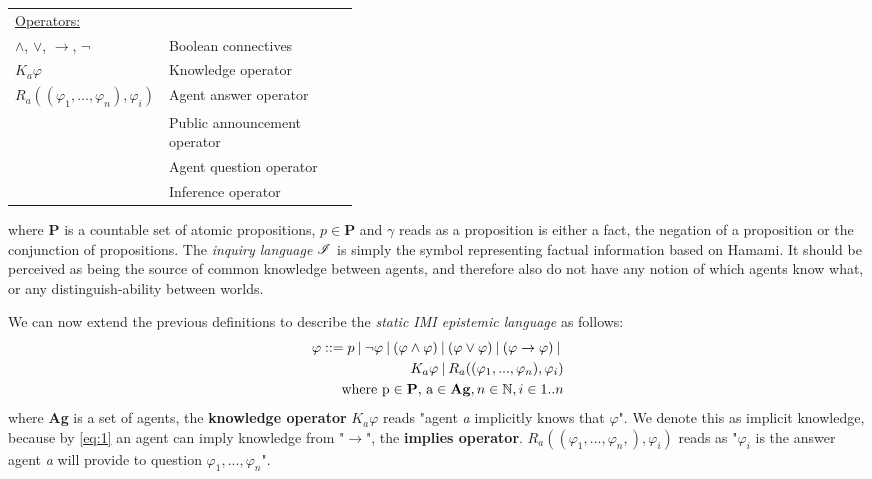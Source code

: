 \begin{table}[t]
\begin{tabularx}{\linewidth}{p{0.40\linewidth}X}
		\multicolumn{2}{l}{{\underline{Operators:}}}                                                           \\
		$\land$, $\lor$, $\rightarrow$, $\neg$    & Boolean connectives                                      \\
		$K_a\varphi$                                & Knowledge operator                                       \\
		$R_a((\varphi_1,...,\varphi_n), \varphi_i)$ & Agent answer operator                                    \\
		\pubop                                      & Public announcement operator                             \\
		\agquestop                                  & Agent question operator                                  \\
		\infop                                      & Inference operator                                       \\
		
		\bottomrule
	\end{tabularx}
\end{table}
where \textbf{P} is a countable set of atomic propositions, $p \in\mathbf{P}$
and $\gamma$ reads as a proposition is either a fact, the negation of a
proposition or the conjunction of propositions. The \textit{inquiry language}
$\mathscr{I}$ is simply the symbol representing factual information based on
Hamami\cite{delimi}. It should be perceived as being the source of common
knowledge between agents, and therefore also do not have any notion of which
agents know what, or any distinguish-ability between worlds.

We can now extend the previous definitions to describe the \textit{static IMI
    epistemic language} \staticlang\: as follows:
\begin{align}
    \begin{split}
        \varphi ::= p \:|\:\neg\varphi\:|\:(\varphi \land \varphi) \:|\: (\varphi \lor \varphi) \:|\: (\varphi \rightarrow \varphi) \:|\: \\K_a\varphi \:|\: R_a((\varphi_1,...,\varphi_n), \varphi_i) \\ \text{where p} \in \text{\textbf{P}}\text{, a} \in \text{\textbf{Ag}}, n \in \mathbb{N}, i \in 1..n \label{eq:2}
    \end{split}
\end{align}
where \textbf{Ag} is a set of agents, the \textbf{knowledge operator} $K_a\varphi$ reads "agent \textit{a} implicitly knows that $\varphi$". We denote this as implicit knowledge, because by \cref{eq:1} an agent can imply knowledge from "$\rightarrow$", the \textbf{implies operator}. $R_a((\varphi_1,...,\varphi_n,), \varphi_i)$ reads as "$\varphi_i$ is the answer agent \textit{a} will provide to question $\varphi_1,...,\varphi_n$". \\

